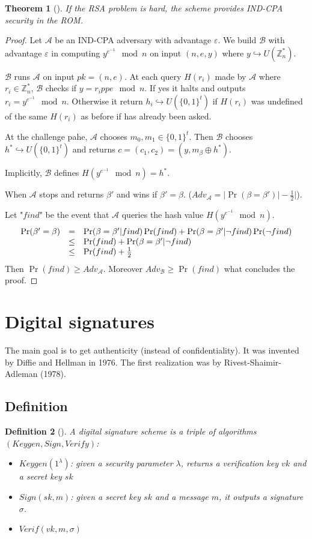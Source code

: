 \documentclass{article}
\newtheorem{thm}{Theorem}[section]
\newtheorem{defi}[thm]{Definition}
\newcommand{\Thm}[3]{\begin{thm}[#1]\label{#2}#3\end{thm}}
\newcommand{\Def}[3]{\begin{defi}[#1]\label{#2}#3\end{defi}}
\newcommand{\Z}{\mathbb{Z}}
\newcommand{\A}{\mathcal{A}}
\newcommand{\B}{\mathcal{B}}
\newcommand{\half}{\frac{1}{2}}
\newcommand{\bit}{\{0,1\}}
\renewcommand{\epsilon}{\varepsilon}
\begin{document}
\Thm{}{}{If the RSA problem is hard, the scheme provides IND-CPA security in the ROM.}
\begin{proof}
Let $\A$ be an IND-CPA adversary with advantage $\epsilon$. We build $\B$ with advantage $\varepsilon$ in computing $y^{e^{-1}}\mod{n}$ on input $(n,e,y)$ where $y\hookrightarrow U(\Z_n^*)$. 

$\B$ runs $\A$ on input $pk = (n,e)$. At each query $H(r_i)$ made by $\A$ where $r_i\in\Z_n^*$, $\B$ checks if $y=r_ippe\mod{n}$. If yes it halts and outputs $r_i=y^{e^{-1}}\mod{n}$. Otherwise it return $h_i\hookrightarrow U(\bit^t)$ if $H(r_i)$ was undefined of the same $H(r_i)$ as before if has already been asked.

At the challenge pahe, $\A$ chooses $m_0,m_1\in\bit^t$. Then $\B$ chooses $h^*\hookrightarrow U(\bit^t)$ and returns $c=(c_1,c_2)=(y,m_\beta\oplus h^*)$. 

Implicitly, $\B$ defines $H(y^{e^{-1}}\mod{n})=h^*$.

When $\A$ stops and returns $\beta'$ and wins if $\beta'=\beta$. ($Adv_\A=|\Pr(\beta=\beta')|-\half|$).

Let "$find$" be the event that $\A$ queries the hash value $H(y^{e^{-1}}\mod{n})$.
\[\begin{array}{r c l}
\Pr(\beta'=\beta) &=& \Pr(\beta=\beta'|find)\Pr(find)+\Pr(\beta=\beta'|\neg find)\Pr(\neg find)\\
&\leq&\Pr(find) + \Pr(\beta=\beta'|\neg find) \\
&\leq& \Pr(find)+\half
\end{array}\]
Then $\Pr(find)\geq Adv_\A$. Moreover $Adv_\B\geq\Pr(find)$ what concludes the proof.
\end{proof}

\section{Digital signatures}
The main goal is to get authenticity (instead of confidentiality). It was invented by Diffie and Hellman in 1976. The first realization was by Rivest-Shaimir-Adleman (1978).

\subsection{Definition}
\Def{}{}{A digital signature scheme is a triple of algorithms $(Keygen,Sign,Verify)$:\begin{itemize}
\item $Keygen(1^\lambda)$: given a security parameter $\lambda$, returns a verification key $vk$ and a secret key $sk$
\item $Sign(sk,m)$: given a secret key $sk$ and a message $m$, it outputs a signature $\sigma$.
\item $Verif(vk,m,\sigma)$
\end{itemize}}
\end{document}
